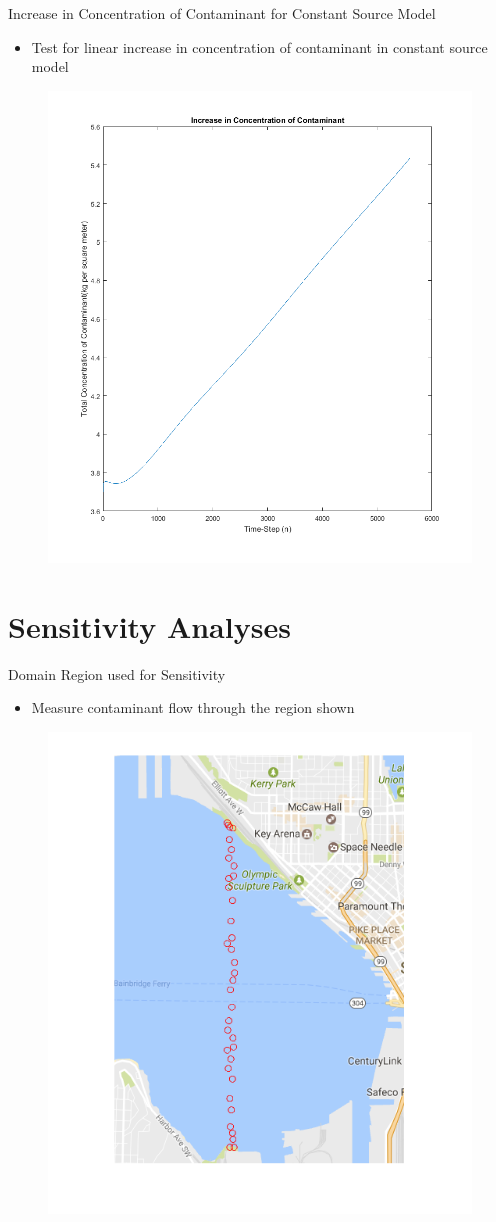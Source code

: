 \documentclass[10pt]{beamer}
\begin{document}
\begin{frame}{Increase in Concentration of Contaminant for Constant Source Model}\label{ConstIncrease}

\begin{itemize}
\item Test for linear increase in concentration of contaminant in constant source model
\end{itemize}

\begin{figure} 
\includegraphics[trim=0mm 0mm 0mm 0mm,clip,width=.61\linewidth]{constincrease.png}
\end{figure}
\hyperlink{Questions}{}
\end{frame}

\section{Sensitivity Analyses}

\begin{frame}{Domain Region used for Sensitivity}\label{Region}

\begin{itemize}
\item Measure contaminant flow through the region shown
\end{itemize}

\begin{figure} 
\includegraphics[trim=0mm 0mm 0mm 0mm,clip,width=0.5\linewidth]{sensewall.png}
\end{figure}
\hyperlink{Questions}{}
\end{frame}
\end{document}
